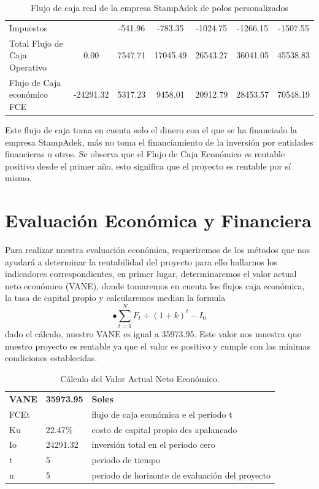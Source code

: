 \documentclass[a4paper,openright,12pt]{book}
\begin{document}
\begin{table}[H]
{\begin{tabular}{lcccccc}
Impuestos                          &                & -541.96        & -783.35        & -1024.75       & -1266.15       & -1507.55       \\
Total Flujo de Caja Operativo      & 0.00           & 7547.71        & 17045.49       & 26543.27       & 36041.05       & 45538.83       \\
Flujo de Caja económico FCE        & -24291.32      & 5317.23        & 9458.01        & 20912.79       & 28453.57       & 70548.19       \\ \hline
\end{tabular}
}
\caption{Flujo de caja real de la empresa StampAdek de polos personalizados}
\label{Tabla13}
\end{table}

Este flujo de caja toma en cuenta solo el dinero con el que se ha financiado la empresa StampAdek, más no toma el financiamiento de la inversión por entidades financieras u otros. Se observa que el Flujo de Caja Económico es rentable positivo desde el primer año, esto significa que el proyecto es rentable por sí mismo.

\section{Evaluación Económica y Financiera}

Para realizar nuestra evaluación económica, requeriremos de los métodos que nos ayudará a determinar la rentabilidad del proyecto para ello hallarnos los indicadores correspondientes, en primer lugar, determinaremos el valor actual neto económico (VANE), donde tomaremos en cuenta los flujos caja económica, la tasa de capital propio y calcularemos median la formula
\begin{equation}
•\sum^{N}_{t=1}F_{t}\div(1+k)^{t} - I_{0}
\end{equation}
dado el cálculo, nuestro VANE es igual a 35973.95. Este valor nos muestra que nuestro proyecto es rentable ya que el valor es positivo y cumple con las mínimas condiciones establecidas. 

\begin{table}[H]
\begin{tabular}{lll}
\textbf{VANE}  & \textbf{35973.95} & \textbf{Soles}                                   \\
FCEt &          & flujo de caja económica e el periodo   t        \\
Ku   & 22.47\%  & costo de capital propio des apalancado          \\
Io   & 24291.32 & inversión total en el periodo cero              \\
t    & 5        & periodo de tiempo                               \\
n    & 5        & periodo de horizonte de evaluación del proyecto
\end{tabular}
\caption{Cálculo del Valor Actual Neto Económico.}
\label{Tabla14}
\end{table}
\end{document}
